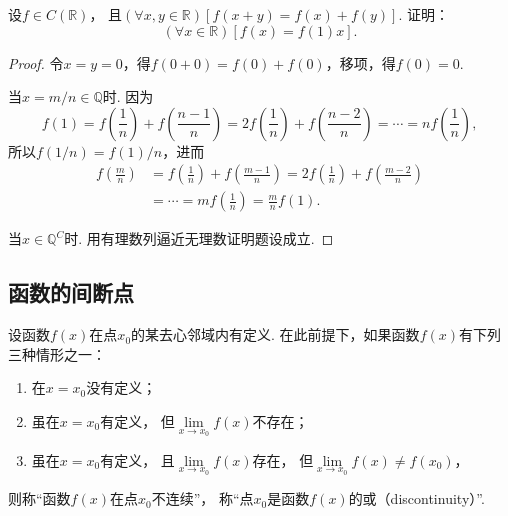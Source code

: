 \begin{example}
设\(f \in C(\mathbb{R})\)，
且\((\forall x,y\in\mathbb{R})[f(x+y) = f(x) + f(y)]\).
证明：\[
	(\forall x\in\mathbb{R})[f(x) = f(1) x].
\]
\begin{proof}
\def\f#1#2{f\left(\frac{#1}{#2}\right)}
令\(x=y=0\)，得\(f(0+0) = f(0) + f(0)\)，移项，得\(f(0) = 0\).

当\(x = m/n \in \mathbb{Q}\)时.
因为\[
	f(1) = \f{1}{n} + \f{n-1}{n}
	= 2 \f{1}{n} + \f{n-2}{n}
	= \dotsb
	= n \f{1}{n},
\]
所以\(f(1/n) = f(1) / n\)，进而\[
	\begin{split}
	\f{m}{n}
	&= \f{1}{n} + \f{m-1}{n}
	= 2 \f{1}{n} + \f{m-2}{n} \\
	&= \dotsb
	= m \f{1}{n} = \frac{m}{n} f(1).
	\end{split}
\]

当\(x \in \mathbb{Q}^C\)时.
用有理数列逼近无理数证明题设成立.
\end{proof}
\end{example}

%
%
%

\subsection{函数的间断点}
设函数\(f(x)\)在点\(x_0\)的某去心邻域内有定义.
在此前提下，如果函数\(f(x)\)有下列三种情形之一：
\begin{enumerate}
	\item 在\(x=x_0\)没有定义；
	\item 虽在\(x=x_0\)有定义，
	但\(\lim\limits_{x \to x_0} f(x)\)不存在；
	\item 虽在\(x=x_0\)有定义，
	且\(\lim\limits_{x \to x_0} f(x)\)存在，
	但\(\lim\limits_{x \to x_0} f(x) \neq f(x_0)\)，
\end{enumerate}
则称“函数\(f(x)\)在点\(x_0\)不连续”，
称“点\(x_0\)是函数\(f(x)\)的或（discontinuity）”.

